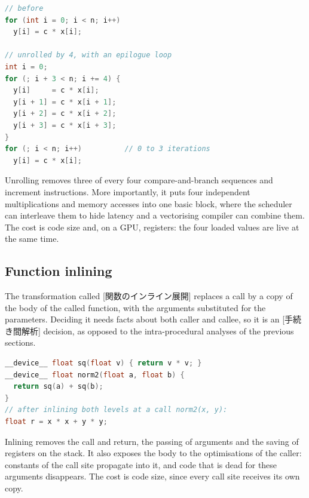 \documentclass[../main.tex]{subfiles}
\begin{document}
\begin{lstlisting}[language=C++, numbers=none]
// before
for (int i = 0; i < n; i++)
  y[i] = c * x[i];

// unrolled by 4, with an epilogue loop
int i = 0;
for (; i + 3 < n; i += 4) {
  y[i]     = c * x[i];
  y[i + 1] = c * x[i + 1];
  y[i + 2] = c * x[i + 2];
  y[i + 3] = c * x[i + 3];
}
for (; i < n; i++)          // 0 to 3 iterations
  y[i] = c * x[i];
\end{lstlisting}

%
Unrolling removes three of every four compare-and-branch sequences and
increment instructions.  More importantly, it puts four independent
multiplications and memory accesses into one basic block, where the
scheduler can interleave them to hide latency and a vectorising
compiler can combine them.  The cost is code size and, on a GPU,
registers: the four loaded values are live at the same time.

\subsection{Function inlining}

\begin{definition}
  \label{def:l11-inlining}
  The transformation called [関数のインライン展開]
  replaces a call by a copy
  of the body of the called function, with the arguments substituted
  for the parameters.  Deciding it needs facts about both caller and
  callee, so it is an [手続き間解析]
  decision, as opposed to the intra-procedural analyses of the previous
  sections.
\end{definition}

\begin{lstlisting}[language=C++, numbers=none]
__device__ float sq(float v) { return v * v; }
__device__ float norm2(float a, float b) {
  return sq(a) + sq(b);
}
// after inlining both levels at a call norm2(x, y):
float r = x * x + y * y;
\end{lstlisting}

Inlining removes the call and return, the passing of arguments and the
saving of registers on the stack.  It also exposes the body to the
optimisations of the caller: constants of the call site propagate into
it, and code that is dead for these arguments disappears.  The cost is
code size, since every call site receives its own copy.
\end{document}
